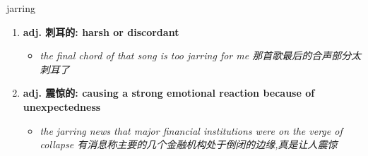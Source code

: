 
\begin{frame}
{\huge jarring}
\begin{center}
\begin{enumerate}\Large
  \item \textbf{adj. 刺耳的: harsh or discordant}
  \begin{itemize}
    \item \em{\Large{the final chord of that song is too jarring for me 那首歌最后的合声部分太刺耳了}}
  \end{itemize}
  \item \textbf{adj. 震惊的: causing a strong emotional reaction because of unexpectedness}
  \begin{itemize}
    \item \em{\Large{the jarring news that major financial institutions were on the verge of collapse 有消息称主要的几个金融机构处于倒闭的边缘,真是让人震惊}}
  \end{itemize}
\end{enumerate}
\end{center}
\end{frame}
